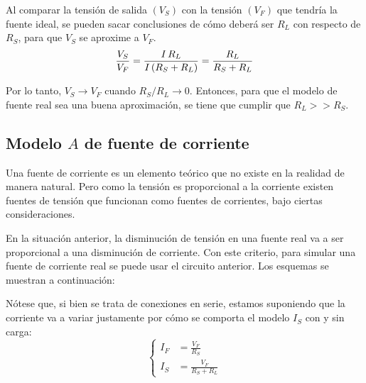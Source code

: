 \documentclass[a5paper,12pt,twoside]{book}
\begin{document}
Al comparar la tensión de salida $(V_S)$ con la tensión $(V_F)$ que tendría la fuente ideal, se pueden sacar conclusiones de cómo deberá ser $R_L$ con respecto de $R_S$, para que $V_S$ se aproxime a $V_F$.
\begin{equation*}
    \frac{V_S}{V_F} = \frac{I \, R_L}{I \left(R_S + R_L\right)} = \frac{R_L}{R_S + R_L}
\end{equation*}

Por lo tanto, $V_S \to V_F$ cuando $R_S / R_L \to 0$. Entonces, para que el modelo de fuente real sea una buena aproximación, se tiene que cumplir que $R_L >> R_S$.

\begin{center}
    \def\svgwidth{0.6\linewidth}
    
\end{center}


\subsection{Modelo $A$ de fuente de corriente}

Una fuente de corriente es un elemento teórico que no existe en la realidad de manera natural. Pero como la tensión es proporcional a la corriente existen fuentes de tensión que funcionan como fuentes de corrientes, bajo ciertas consideraciones.

En la situación anterior, la disminución de tensión en una fuente real va a ser proporcional a una disminución de corriente.
Con este criterio, para simular una fuente de corriente real se puede usar el circuito anterior.
Los esquemas se muestran a continuación:

\begin{multicols}{2}
    \begin{center}
        \def\svgwidth{0.9\linewidth}
        
    \end{center}
    \begin{center}
        \def\svgwidth{0.9\linewidth}
        
    \end{center}
\end{multicols}

Nótese que, si bien se trata de conexiones en serie, estamos suponiendo que la corriente va a variar justamente por cómo se comporta el modelo $I_S$ con y sin carga:
\begin{equation*}
    \left\{
    \begin{aligned}
        I_F &= \frac{V_F}{R_S}
        \\[1ex]
        I_S &= \frac{V_F}{R_S + R_L}
    \end{aligned}
    \right.
\end{equation*}
\end{document}
